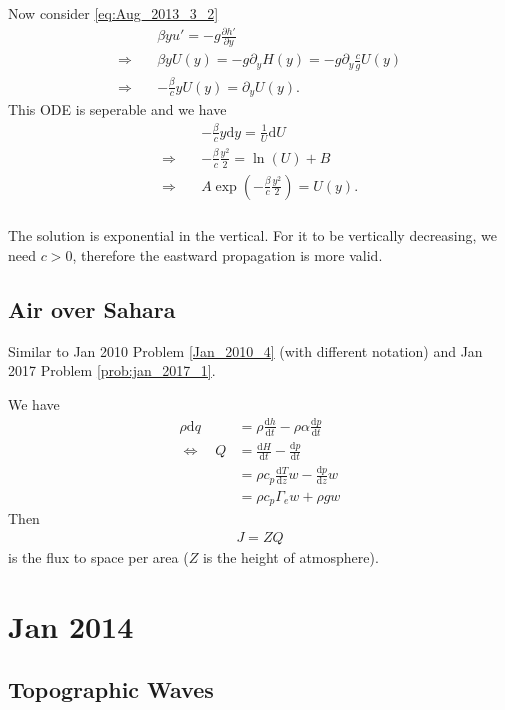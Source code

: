 \documentclass[11pt,letterpaper]{book}
\theoremstyle{definition}
\newcommand{\de}{\mathrm{d}}
\newcommand{\pe}{\partial}
\newcommand{\thus}{\Rightarrow \quad }
\newcommand{\fff}{\iff\quad}
\begin{document}
\subsection{}
Now consider \eqref{eq:Aug_2013_3_2}
\begin{align*}
    &\beta y u' = -g\frac{\pe h'}{\pe y}\\
    \thus& \beta y U(y) = -g \pe_y H(y) = -g \pe_y \frac{c}{g}U(y)\\
    \thus& -\frac{\beta}{c} y U(y) = \pe_y U(y).
\end{align*}
This ODE is seperable and we have
\begin{align*}
    &-\frac{\beta}{c} y \de y = \frac{1}{U}\de U\\
    \thus& -\frac{\beta}{c}\frac{y^2}{2} = \ln(U)+B\\
    \thus& A\exp\left(-\frac{\beta}{c}\frac{y^2}{2}\right) = U(y).
\end{align*}

\subsection{}
The solution is exponential in the vertical. For it to be vertically decreasing, we need $c>0$, therefore the eastward propagation is more valid.

\section{Air over Sahara}
Similar to Jan 2010 Problem \ref{Jan_2010_4} (with different notation) and Jan 2017 Problem \ref{prob:jan_2017_1}.

We have
\begin{align*}
    \rho \de q &= \rho \frac{\de h}{\de t}-\rho \alpha\frac{\de p}{\de t}\\
    \fff Q &= \frac{\de H}{\de t}-\frac{\de p}{\de t}\\
    &= \rho c_p \frac{\de T}{\de z}w-\frac{\de p}{\de z}w\\
    &= \rho c_p \Gamma_e w+\rho g w
\end{align*}
Then 
\begin{align*}
    J = ZQ
\end{align*}
is the flux to space per area ($Z$ is the height of atmosphere).

\chapter{Jan 2014}
\section{Topographic Waves}\label{prob:jan_2014_1}
\end{document}
